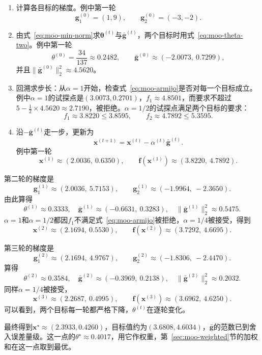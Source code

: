 \begin{enumerate}
 \item 计算各目标的梯度。例中第一轮
 \[
  \bm{g}_1^{(0)}=(1,9),\qquad\bm{g}_2^{(0)}=(-3,-2).
 \]

 \item 由式~\eqref{eq:moo-min-norm}求$\bm{\theta}^{(t)}$与$\bar{\bm{g}}^{(t)}$，两个目标时用式~\eqref{eq:moo-theta-two}。例中第一轮
 \[
  \theta^{(0)}=\frac{34}{137}\approx0.2482,\qquad
  \bar{\bm{g}}^{(0)}\approx(-2.0073,\ 0.7299),
 \]
 并且$\lVert\bar{\bm{g}}^{(0)}\rVert_2^2\approx4.5620$。

 \item 回溯求步长：从$\alpha=1$开始，检查式~\eqref{eq:moo-armijo}是否对每一个目标成立。例中$\alpha=1$的试探点是$(3.0073,0.2701)$，$f_1\approx4.8501$，而要求不超过$5-\frac12\times4.5620\approx2.7190$，被拒绝。$\alpha=1/2$的试探点满足两个目标的要求：
 \[
  f_1\approx3.8220\leq3.8595,\qquad f_2\approx4.7892\leq5.3595.
 \]

 \item 沿$-\bar{\bm{g}}^{(t)}$走一步，更新为
 \begin{equation}
  \bm{x}^{(t+1)}=\bm{x}^{(t)}-\alpha^{(t)}\bar{\bm{g}}^{(t)}.
  \label{eq:moo-mgda-update}
 \end{equation}
 例中第一轮
 \[
  \bm{x}^{(1)}\approx(2.0036,\ 0.6350),\qquad
  \bm{f}(\bm{x}^{(1)})\approx(3.8220,\ 4.7892).
 \]
\end{enumerate}

第二轮的梯度是
\[
 \bm{g}_1^{(1)}\approx(2.0036,\ 5.7153),\qquad
 \bm{g}_2^{(1)}\approx(-1.9964,\ -2.3650).
\]
由此算得
\[
 \theta^{(1)}\approx0.3333,\quad
 \bar{\bm{g}}^{(1)}\approx(-0.6631,\ 0.3283),\quad
 \lVert\bar{\bm{g}}^{(1)}\rVert_2^2\approx0.5475.
\]
$\alpha=1$和$\alpha=1/2$都因$f_1$不满足式~\eqref{eq:moo-armijo}被拒绝，$\alpha=1/4$被接受，得到
\[
 \bm{x}^{(2)}\approx(2.1694,\ 0.5530),\qquad
 \bm{f}(\bm{x}^{(2)})\approx(3.7292,\ 4.6695).
\]

第三轮的梯度是
\[
 \bm{g}_1^{(2)}\approx(2.1694,\ 4.9767),\qquad
 \bm{g}_2^{(2)}\approx(-1.8306,\ -2.4470).
\]
算得
\[
 \theta^{(2)}\approx0.3584,\quad
 \bar{\bm{g}}^{(2)}\approx(-0.3969,\ 0.2138),\quad
 \lVert\bar{\bm{g}}^{(2)}\rVert_2^2\approx0.2032.
\]
同样$\alpha=1/4$被接受，
\[
 \bm{x}^{(3)}\approx(2.2687,\ 0.4995),\qquad
 \bm{f}(\bm{x}^{(3)})\approx(3.6962,\ 4.6250).
\]
可以看到，两个目标每一轮都严格下降，$\theta^{(t)}$在逐轮变化。

最终得到$\bm{x}^\star\approx(2.3933,0.4260)$，目标值约为$(3.6808,4.6034)$，$\bar{\bm{g}}$的范数已到舍入误差量级。这一点的$\theta^\star\approx0.4017$，用它作权重，第~\ref{sec:moo-weighted}节的加权和在这一点取到最优。


